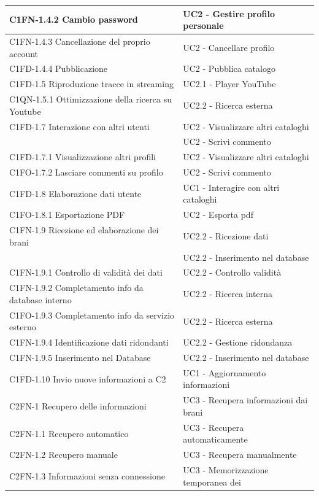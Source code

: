 \begin{footnotesize}
\begin{longtable}[!h]{|l|l|}
\hline
C1FN-1.4.2 Cambio password & UC2 - Gestire profilo personale \\ \hline
C1FN-1.4.3 Cancellazione del proprio account & UC2 - Cancellare profilo \\
\hline
C1FD-1.4.4 Pubblicazione & UC2 - Pubblica catalogo \\ \hline
C1FD-1.5 Riproduzione tracce in streaming & UC2.1 - Player YouTube \\ \hline
C1QN-1.5.1 Ottimizzazione della ricerca su Youtube & UC2.2 - Ricerca esterna \\
\hline
C1FD-1.7 Interazione con altri utenti & UC2 - Visualizzare altri cataloghi \\
 & UC2 - Scrivi commento \\ \hline
C1FD-1.7.1 Visualizzazione altri profili & UC2 - Visualizzare altri cataloghi \\
\hline
C1FO-1.7.2 Lasciare commenti su profilo & UC2 - Scrivi commento \\ \hline
C1FD-1.8 Elaborazione dati utente & UC1 - Interagire con altri cataloghi \\
\hline
C1FO-1.8.1 Esportazione PDF & UC2 - Esporta pdf \\ \hline
C1FN-1.9 Ricezione ed elaborazione dei brani & UC2.2 - Ricezione dati \\
 & UC2.2 - Inserimento nel database \\ \hline
C1FN-1.9.1 Controllo di validit\`a dei dati & UC2.2 - Controllo validit\`a \\
\hline C1FN-1.9.2 Completamento info da database interno & UC2.2 - Ricerca
interna \\ \hline
C1FO-1.9.3 Completamento info da servizio esterno & UC2.2 - Ricerca esterna \\
\hline
C1FN-1.9.4 Identificazione dati ridondanti & UC2.2 - Gestione ridondanza \\
\hline
C1FN-1.9.5 Inserimento nel Database & UC2.2 - Inserimento nel database \\ \hline
C1FD-1.10 Invio nuove informazioni a C2 & UC1 - Aggiornamento informazioni \\
\hline
C2FN-1 Recupero delle informazioni & UC3 - Recupera informazioni dai brani \\
\hline
C2FN-1.1 Recupero automatico & UC3 - Recupera automaticamente \\ \hline
C2FN-1.2 Recupero manuale & UC3 - Recupera manualmente \\ \hline
C2FN-1.3 Informazioni senza connessione & UC3 - Memorizzazione temporanea dei

\end{longtable}
\end{footnotesize}
